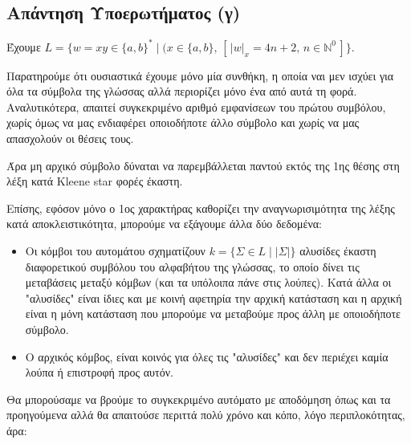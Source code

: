 \subsection{Απάντηση Υποερωτήματος (γ)}
\label{ssec:Solution_2.3}
\doublespacing
Έχουμε $L = \{ w = xy \in \{a, b\}^* \; \vert \; (x \in \{a, b\},\, [\,\vert w\vert_x = 4n+2,\, n \in
\mathbb{N}^0\,]\}$.

\par
Παρατηρούμε ότι ουσιαστικά έχουμε μόνο μία συνθήκη, η οποία ναι μεν ισχύει για όλα τα σύμβολα της γλώσσας αλλά
περιορίζει μόνο ένα από αυτά τη φορά. Αναλυτικότερα, απαιτεί
συγκεκριμένο αριθμό εμφανίσεων του πρώτου συμβόλου, χωρίς όμως να μας ενδιαφέρει οποιοδήποτε άλλο σύμβολο και χωρίς
να μας απασχολούν οι θέσεις τους.

Άρα μη αρχικό σύμβολο δύναται να παρεμβάλλεται παντού εκτός της 1ης θέσης στη λέξη κατά Kleene star
φορές έκαστη.

Επίσης, εφόσον μόνο ο 1ος χαρακτήρας καθορίζει την αναγνωρισιμότητα της λέξης κατά
αποκλειστικότητα, μπορούμε να εξάγουμε άλλα δύο δεδομένα:

\begin{itemize}
	\itemsep0em
	\item Οι κόμβοι του αυτομάτου σχηματίζουν $k = \{\Sigma \in L \;\vert\; \vert\Sigma\vert\}$ αλυσίδες έκαστη
	διαφορετικού
	συμβόλου του αλφαβήτου της γλώσσας, το οποίο δίνει τις μεταβάσεις μεταξύ κόμβων (και τα υπόλοιπα πάνε στις
	λούπες). Κατά άλλα οι "αλυσίδες" είναι ίδιες και με κοινή αφετηρία την αρχική κατάσταση και η αρχική είναι η
	μόνη κατάσταση που μπορούμε να μεταβούμε προς άλλη με οποιοδήποτε σύμβολο.

	\item Ο αρχικός κόμβος, είναι κοινός για όλες τις "αλυσίδες" και δεν περιέχει καμία λούπα ή επιστροφή προς
	αυτόν.

\end{itemize}

Θα μπορούσαμε να βρούμε το συγκεκριμένο αυτόματο με αποδόμηση όπως και τα προηγούμενα αλλά θα απαιτούσε περιττά
πολύ χρόνο και κόπο, λόγο περιπλοκότητας, άρα:

